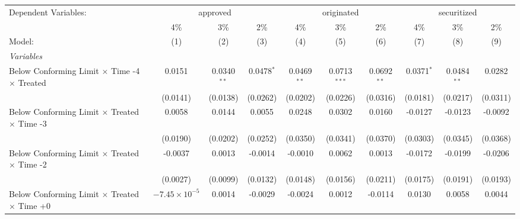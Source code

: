 \begingroup
\centering
\begin{tabular}{lccccccccc}
   \tabularnewline \midrule \midrule
   Dependent Variables: & \multicolumn{3}{c}{approved} & \multicolumn{3}{c}{originated} & \multicolumn{3}{c}{securitized}\\
                                                              & 4\%                    & 3\%            & 2\%           & 4\%           & 3\%            & 2\%           & 4\%           & 3\%           & 2\% \\    
   Model:                                                     & (1)                    & (2)            & (3)           & (4)           & (5)            & (6)           & (7)           & (8)           & (9)\\  
   \midrule
   \emph{Variables}\\
   Below Conforming Limit $\times$ Time -4 $\times$ Treated   & 0.0151                 & 0.0340$^{**}$  & 0.0478$^{*}$  & 0.0469$^{**}$ & 0.0713$^{***}$ & 0.0692$^{**}$ & 0.0371$^{*}$  & 0.0484$^{**}$ & 0.0282\\   
                                                              & (0.0141)               & (0.0138)       & (0.0262)      & (0.0202)      & (0.0226)       & (0.0316)      & (0.0181)      & (0.0217)      & (0.0311)\\   
   Below Conforming Limit $\times$ Treated $\times$ Time -3   & 0.0058                 & 0.0144         & 0.0055        & 0.0248        & 0.0302         & 0.0160        & -0.0127       & -0.0123       & -0.0092\\   
                                                              & (0.0190)               & (0.0202)       & (0.0252)      & (0.0350)      & (0.0341)       & (0.0370)      & (0.0303)      & (0.0345)      & (0.0368)\\   
   Below Conforming Limit $\times$ Treated $\times$ Time -2   & -0.0037                & 0.0013         & -0.0014       & -0.0010       & 0.0062         & 0.0013        & -0.0172       & -0.0199       & -0.0206\\   
                                                              & (0.0027)               & (0.0099)       & (0.0132)      & (0.0148)      & (0.0156)       & (0.0211)      & (0.0175)      & (0.0191)      & (0.0193)\\   
   Below Conforming Limit $\times$ Treated $\times$ Time +0   & $-7.45\times 10^{-5}$  & 0.0014         & -0.0029       & -0.0024       & 0.0012         & -0.0114       & 0.0130        & 0.0058        & 0.0044\\   

\end{tabular}
